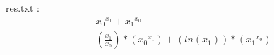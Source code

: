 \documentclass[12pt]{article}
\begin{document}
 res.txt : \\

 \begin{gather*}
{x_{0}}^{{x_{1}}}+{x_{1}}^{{x_{0}}}
\\
\left(\frac{{x_{1}}}{{x_{0}}}\right)*\left({x_{0}}^{{x_{1}}}\right)+\left(ln\left({x_{1}}\right)\right)*\left({x_{1}}^{{x_{0}}}\right)
\end{gather*}
\end{document}
